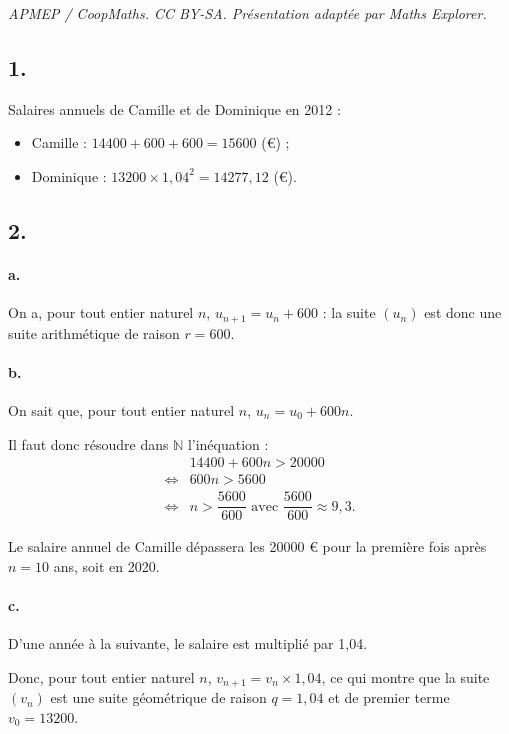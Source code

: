 \documentclass[10pt]{article}
\begin{document}
\noindent\textit{APMEP / CoopMaths. CC BY-SA. Présentation adaptée par Maths Explorer.}\par\medskip
\subsection*{1.}

Salaires annuels de Camille et de Dominique en 2012 :
\begin{itemize}
    \item Camille : \(14400 + 600 + 600 = 15600\) (€) ;
    \item Dominique : \(13200 \times 1{,}04^2 = 14277{,}12\) (€).
\end{itemize}

\subsection*{2.}

\paragraph{a.} On a, pour tout entier naturel \( n \), \( u_{n+1} = u_n + 600 \) : la suite \( (u_n) \) est donc une suite arithmétique de raison \(r = 600\).

\paragraph{b.} On sait que, pour tout entier naturel \( n \), \( u_n = u_0 + 600n \).

Il faut donc résoudre dans \( \mathbb{N} \) l'inéquation :
\begin{align*}
&14400 + 600n > 20000 \\
\iff &600n > 5600 \\
\iff &n > \dfrac{5600}{600} \text{ avec } \dfrac{5600}{600} \approx 9{,}3.
\end{align*}

Le salaire annuel de Camille dépassera les 20000 € pour la première fois après \(n = 10\) ans, soit en 2020.

\paragraph{c.} D'une année à la suivante, le salaire est multiplié par 1{,}04.

Donc, pour tout entier naturel \( n \), \( v_{n+1} = v_n \times 1{,}04 \), ce qui montre que la suite \( (v_n) \) est une suite géométrique de raison \(q = 1{,}04\) et de premier terme \( v_0 = 13200 \).
\end{document}
